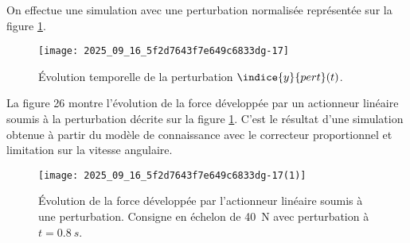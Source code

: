 \ifprof
\begin{corrige}
\end{corrige}
\else
\fi

On effectue une simulation avec une perturbation normalisée représentée sur la figure \ref{ccs_mp_2023_fig_25}.


\begin{figure}[!h]
\centering
\texttt{[image: 2025\_09\_16\_5f2d7643f7e649c6833dg-17]}
\caption{\label{ccs_mp_2023_fig_25}  Évolution temporelle de la perturbation $\indice{y}{pert}(t)$.}

\end{figure}



La figure 26 montre l'évolution de la force développée par un actionneur linéaire soumis à la perturbation décrite sur la figure \ref{ccs_mp_2023_fig_25}. C'est le résultat d'une simulation obtenue à partir du modèle de connaissance avec le correcteur proportionnel et limitation sur la vitesse angulaire.
%


\begin{figure}[!h]
\centering
\texttt{[image: 2025\_09\_16\_5f2d7643f7e649c6833dg-17(1)]}
\caption{\label{ccs_mp_2023_fig_}   Évolution de la force développée par l'actionneur linéaire soumis à une perturbation. Consigne en échelon de \SI{40}{N} avec perturbation à $t=\SI{0,8}{s}$.}

\end{figure}



